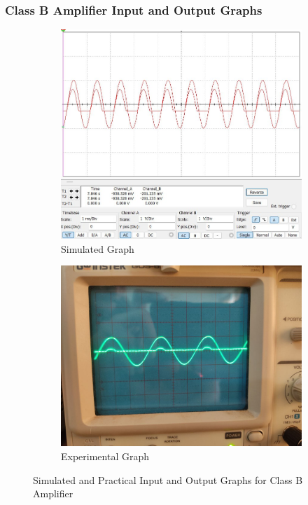 \documentclass[12pt]{article}
\begin{document}
\subsubsection{Class B Amplifier Input and Output Graphs}
\begin{figure}[h!]
    \centering
    \begin{subfigure}{0.45\textwidth}
        \includegraphics[width=\textwidth]{Class_B_Graph.jpg}
        \caption{Simulated Graph}
    \end{subfigure}
    \begin{subfigure}{0.45\textwidth}
        \includegraphics[width=\textwidth]{Class_B_Practical.jpg}
        \caption{Experimental Graph}
    \end{subfigure}
    \caption{Simulated and Practical Input and Output Graphs for Class B Amplifier}
\end{figure}
\end{document}
